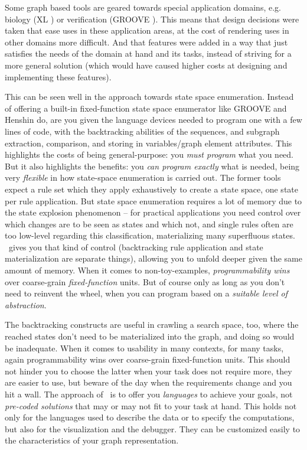 Some graph based tools are geared towards special application domains, e.g. biology (XL \cite{xl}) or verification (GROOVE \cite{Groove}).
This means that design decisions were taken that ease uses in these application areas, at the cost of rendering uses in other domains more difficult.
And that features were added in a way that just satisfies the needs of the domain at hand and its tasks, instead of striving for a more general solution (which would have caused higher costs at designing and implementing these features).

This can be seen well in the approach towards state space enumeration. 
Instead of offering a built-in fixed-function state space enumerator like GROOVE and Henshin do, are you given the language devices needed to program one with a few lines of code, with the backtracking abilities of the sequences, and subgraph extraction, comparison, and storing in variables/graph element attributes.
This highlights the costs of being general-purpose: you \emph{must program} what you need.
But it also highlights the benefits: you \emph{can program exactly} what is needed, being very \emph{flexible} in how state-space enumeration is carried out.
The former tools expect a rule set which they apply exhaustively to create a state space, one state per rule application. 
But state space enumeration requires a lot of memory due to the state explosion phenomenon -- for practical applications you need control over which changes are to be seen as states and which not, and single rules often are too low-level regarding this classification, materializing many superfluous states.
\GrG\ gives you that kind of control (backtracking rule application and state materialization are separate things), allowing you to unfold deeper given the same amount of memory. 
When it comes to non-toy-examples, \emph{programmability wins} over coarse-grain \emph{fixed-function} units.
But of course only as long as you don't need to reinvent the wheel, when you can program based on a \emph{suitable level of abstraction}.

The backtracking constructs are useful in crawling a search space, too, where the reached states don't need to be materialized into the graph, and doing so would be inadequate.
When it comes to usability in many contexts, for many tasks, again programmability wins over coarse-grain fixed-function units.
This should not hinder you to choose the latter when your task does not require more, they are easier to use, but beware of the day when the requirements change and you hit a wall.
The approach of \GrG\ is to offer you \emph{languages} to achieve your goals, not \emph{pre-coded solutions} that may or may not fit to your task at hand.
This holds not only for the languages used to describe the data or to specify the computations, but also for the visualization and the debugger. 
They can be customized easily to the characteristics of your graph representation. 

